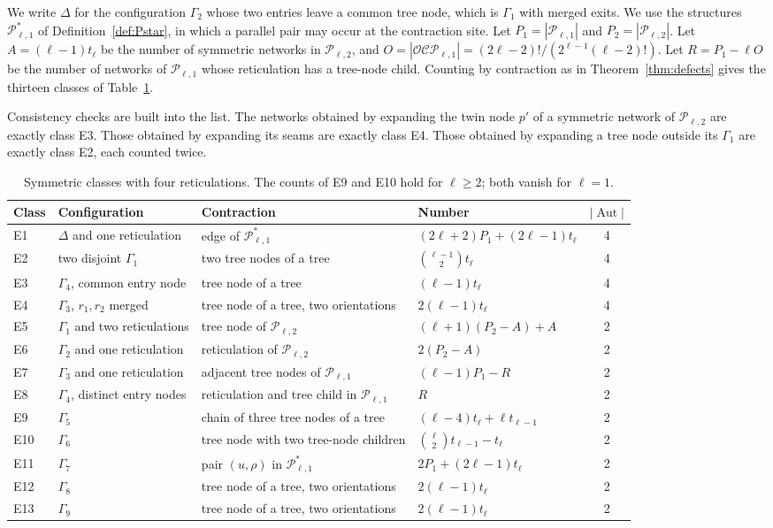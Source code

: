 \documentclass[11pt,a4paper]{article}
\theoremstyle{definition}
\newcommand{\Aut}{\operatorname{Aut}}
\newcommand{\cP}{\mathcal{P}}
\begin{document}
We write $\Delta$ for the configuration $\Gamma_2$ whose two entries leave a common tree node, which is $\Gamma_1$ with merged exits. We use the structures $\cP^*_{\ell,1}$ of Definition~\ref{def:Pstar}, in which a parallel pair may occur at the contraction site. Let $P_1=|\cP_{\ell,1}|$ and $P_2=|\cP_{\ell,2}|$. Let $A=(\ell-1)t_\ell$ be the number of symmetric networks in $\cP_{\ell,2}$, and $O=|\mathcal{OCP}_{\ell,1}|=(2\ell-2)!/(2^{\ell-1}(\ell-2)!)$. Let $R=P_1-\ell O$ be the number of networks of $\cP_{\ell,1}$ whose reticulation has a tree-node child. Counting by contraction as in Theorem~\ref{thm:defects} gives the thirteen classes of Table~\ref{tab:k4classes}.

Consistency checks are built into the list. The networks obtained by expanding the twin node $p'$ of a symmetric network of $\cP_{\ell,2}$ are exactly class E3. Those obtained by expanding its seams are exactly class E4. Those obtained by expanding a tree node outside its $\Gamma_1$ are exactly class E2, each counted twice.

\begin{table}[t]
\centering
\small
\begin{tabular}{lp{3.6cm}p{4.0cm}p{4.6cm}c}
\toprule
Class & Configuration & Contraction & Number & $|\Aut|$\\
\midrule
E1 & $\Delta$ and one reticulation & edge of $\cP^*_{\ell,1}$ & $(2\ell+2)P_1+(2\ell-1)t_\ell$ & 4\\
E2 & two disjoint $\Gamma_1$ & two tree nodes of a tree & $\binom{\ell-1}{2}t_\ell$ & 4\\
E3 & $\Gamma_4$, common entry node & tree node of a tree & $(\ell-1)t_\ell$ & 4\\
E4 & $\Gamma_3$, $r_1,r_2$ merged & tree node of a tree, two orientations & $2(\ell-1)t_\ell$ & 4\\
E5 & $\Gamma_1$ and two reticulations & tree node of $\cP_{\ell,2}$ & $(\ell+1)(P_2-A)+A$ & 2\\
E6 & $\Gamma_2$ and one reticulation & reticulation of $\cP_{\ell,2}$ & $2(P_2-A)$ & 2\\
E7 & $\Gamma_3$ and one reticulation & adjacent tree nodes of $\cP_{\ell,1}$ & $(\ell-1)P_1-R$ & 2\\
E8 & $\Gamma_4$, distinct entry nodes & reticulation and tree child in $\cP_{\ell,1}$ & $R$ & 2\\
E9 & $\Gamma_5$ & chain of three tree nodes of a tree & $(\ell-4)t_\ell+\ell t_{\ell-1}$ & 2\\
E10 & $\Gamma_6$ & tree node with two tree-node children & $\binom{\ell}{2}t_{\ell-1}-t_\ell$ & 2\\
E11 & $\Gamma_7$ & pair $(u,\rho)$ in $\cP^*_{\ell,1}$ & $2P_1+(2\ell-1)t_\ell$ & 2\\
E12 & $\Gamma_8$ & tree node of a tree, two orientations & $2(\ell-1)t_\ell$ & 2\\
E13 & $\Gamma_9$ & tree node of a tree, two orientations & $2(\ell-1)t_\ell$ & 2\\
\bottomrule
\end{tabular}
\caption{Symmetric classes with four reticulations. The counts of E9 and E10 hold for $\ell\ge2$; both vanish for $\ell=1$.}
\label{tab:k4classes}
\end{table}
\end{document}
